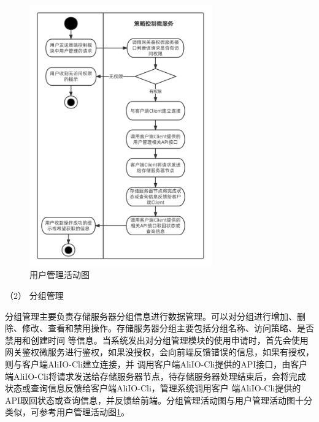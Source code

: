 \begin{figure}[htb]
    \centering
    \includegraphics[width=0.7\textwidth]{my_figures/chapter4/用户管理活动图.png}
    \caption{用户管理活动图}
    \label{fig:用户管理活动图}
\end{figure}

（2） 分组管理

分组管理主要负责存储服务器分组信息进行数据管理。可以对分组进行增加、删除、修改、查看和禁用操作。存储服务器分组主要包括分组名称、访问策略、是否禁用和创建时间
等信息。当系统发出对分组管理模块的使用申请时，首先会使用网关鉴权微服务进行鉴权，如果没授权，会向前端反馈错误的信息，如果有授权，则与客户端AliIO-Cli建立连接，并
调用客户端AliIO-Cli提供的API接口，由客户端AliIO-Cli将请求发送给存储服务器节点，待存储服务器处理结束后，会将完成状态或查询信息反馈给客户端AliIO-Cli，管理系统调用客户
端AliIO-Cli提供的API取回状态或查询信息，并反馈给前端。分组管理活动图与用户管理活动图十分类似，可参考用户管理活动图\ref{fig:用户管理活动图}。


